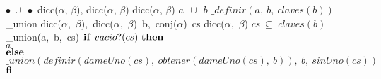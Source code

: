 \tadOperacion
    {$\bullet\ \cup\ \bullet$}
    {dicc($\alpha$, $\beta$), dicc($\alpha$, $\beta$)}
    {dicc($\alpha$, $\beta$)}
    {}
\tadAxioma
    {$a\ \ \cup\ \ b$}
    {$ \_definir(a,\ b,\ claves(b))$}
\vspace{4mm}
\tadOperacion
    {\_union}
    {dicc($\alpha$,\ $\beta$),\ dicc($\alpha$,\ $\beta$)\ b,\ conj($\alpha$)\ cs}
    {dicc($\alpha$,\ $\beta$)}
    {$cs\ \subseteq\ claves(b)$}
\tadAxioma
    {\_union(a,\ b,\ cs)}
    {$ 
    \LIF\ vacio?(cs)\ \LTHEN\ $\\$ 
    $\tab$ a $\\$
    \textrm{\textbf{else}} $\\$ 
    $\tab$ \_union(definir(dameUno(cs),\ obtener(dameUno(cs),\ b)),\ b,\ sinUno(cs)) $\\$ 
    \textrm{\textbf{fi}}
    $}